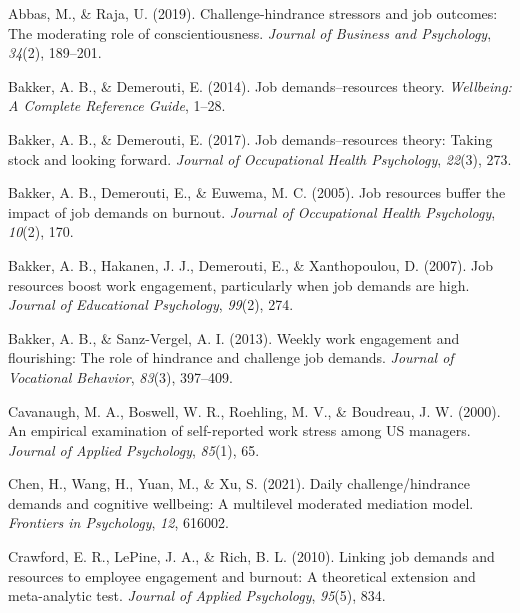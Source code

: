 \documentclass[
  man,mask]{apa7}
\newlength{\cslhangindent}
\newlength{\cslentryspacingunit} %
\newenvironment{CSLReferences}[2] %
 {%
  \setlength{\parindent}{0pt}
  \ifodd #1
  \let\oldpar\par
  \def\par{\hangindent=\cslhangindent\oldpar}
  \fi
  \setlength{\parskip}{#2\cslentryspacingunit}
 }%
 {}
\begin{document}
\hypertarget{refs}{}
\begin{CSLReferences}{1}{0}
\leavevmode{}%
Abbas, M., \& Raja, U. (2019). Challenge-hindrance stressors and job outcomes: The moderating role of conscientiousness. \emph{Journal of Business and Psychology}, \emph{34}(2), 189--201.

\leavevmode{}%
Bakker, A. B., \& Demerouti, E. (2014). Job demands--resources theory. \emph{Wellbeing: A Complete Reference Guide}, 1--28.

\leavevmode{}%
Bakker, A. B., \& Demerouti, E. (2017). Job demands--resources theory: Taking stock and looking forward. \emph{Journal of Occupational Health Psychology}, \emph{22}(3), 273.

\leavevmode{}%
Bakker, A. B., Demerouti, E., \& Euwema, M. C. (2005). Job resources buffer the impact of job demands on burnout. \emph{Journal of Occupational Health Psychology}, \emph{10}(2), 170.

\leavevmode{}%
Bakker, A. B., Hakanen, J. J., Demerouti, E., \& Xanthopoulou, D. (2007). Job resources boost work engagement, particularly when job demands are high. \emph{Journal of Educational Psychology}, \emph{99}(2), 274.

\leavevmode{}%
Bakker, A. B., \& Sanz-Vergel, A. I. (2013). Weekly work engagement and flourishing: The role of hindrance and challenge job demands. \emph{Journal of Vocational Behavior}, \emph{83}(3), 397--409.

\leavevmode{}%
Cavanaugh, M. A., Boswell, W. R., Roehling, M. V., \& Boudreau, J. W. (2000). An empirical examination of self-reported work stress among US managers. \emph{Journal of Applied Psychology}, \emph{85}(1), 65.

\leavevmode{}%
Chen, H., Wang, H., Yuan, M., \& Xu, S. (2021). Daily challenge/hindrance demands and cognitive wellbeing: A multilevel moderated mediation model. \emph{Frontiers in Psychology}, \emph{12}, 616002.

\leavevmode{}%
Crawford, E. R., LePine, J. A., \& Rich, B. L. (2010). Linking job demands and resources to employee engagement and burnout: A theoretical extension and meta-analytic test. \emph{Journal of Applied Psychology}, \emph{95}(5), 834.


\end{CSLReferences}
\end{document}
